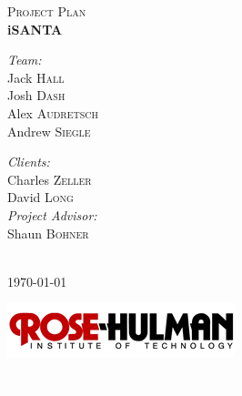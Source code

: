 \documentclass[11pt]{article}
\begin{document}
\begin{titlepage}
\begin{center}
\textsc{\Large Project Plan}\\[0.5cm]
{ \Huge \bfseries iSANTA}\\[0.4cm]

\begin{minipage}{0.4\textwidth}
\begin{flushleft} \large
\emph{Team:}\\
Jack \textsc{Hall}\\
Josh \textsc{Dash}\\
Alex \textsc{Audretsch}\\
Andrew \textsc{Siegle}\\
\end{flushleft}
\end{minipage}
\begin{minipage}{0.4\textwidth}
\begin{flushright} \large
\emph{Clients:} \\
Charles \textsc{Zeller}\\
David \textsc{Long}\\
\emph{Project Advisor:}\\
Shaun \textsc{Bohner}
\end{flushright}
\end{minipage}
\\[1cm]
{\large \today}

\begin{center}
\includegraphics[scale = 4, angle = 0]{Rose-HulmanLogo.png}
\end{center}
\textcolor{white}{.}%
\\[3cm]

\end{center}

\end{titlepage}
\end{document}
